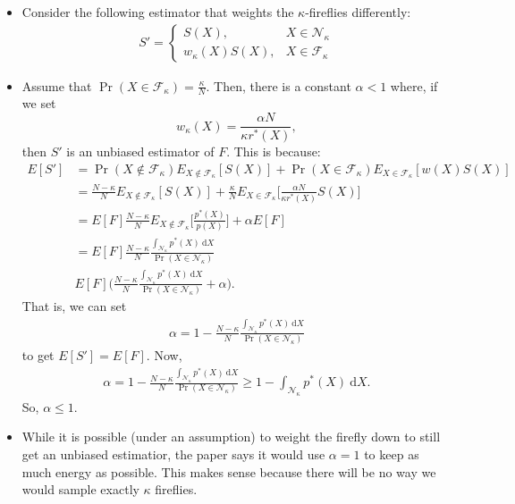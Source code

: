\documentclass[10pt]{article}
\newcommand{\dee}{\mathrm{d}}
\begin{document}
  \begin{itemize}
  	\item Consider the following estimator that weights the $\kappa$-fireflies differently:
  	\begin{align*}
  		S' = \begin{cases}
  			S(X), & X \in \mathcal{N}_\kappa \\
  			w_\kappa(X) S(X), & X \in \mathcal{F}_\kappa 
  		\end{cases}
  	\end{align*}

  	\item Assume that $\Pr(X \in \mathcal{F}_\kappa) = \frac{\kappa}{N}$. Then, there is a constant $\alpha < 1$ where, if we set $$w_\kappa(X) = \frac{\alpha N}{\kappa r^*(X)},$$ then $S'$ is an unbiased estimator of $F$. This is because:
  	\begin{align*}
  		E[S'] 
  		&= \Pr(X \not\in \mathcal{F}_\kappa) E_{X \not\in \mathcal{F}_\kappa} [S(X)] 
  		+ \Pr(X \in \mathcal{F}_\kappa) E_{X \in \mathcal{F}_\kappa}[w(X)S(X)] \\
  		&= \frac{N-\kappa}{N} E_{X \not\in \mathcal{F}_\kappa} [S(X)] 
  		+ \frac{\kappa}{N} E_{X \in \mathcal{F}_\kappa}\bigg[ \frac{\alpha N}{\kappa r^*(X)} S(X)\bigg] \\
  		&= E[F] \frac{N-\kappa}{N} E_{X \not\in \mathcal{F}_\kappa} \bigg[ \frac{p^*(X)}{p(X)} \bigg]
  		+ \alpha E[F] \\ 
  		&= E[F] \frac{N-\kappa}{N} \frac{\int_{\mathcal{N}_\kappa} p^*(X)\ \dee X }{\Pr(X \in \mathcal{N}_\kappa)} \\
  		& E[F] \bigg( \frac{N-\kappa}{N} \frac{\int_{\mathcal{N}_\kappa} p^*(X)\ \dee X }{\Pr(X \in \mathcal{N}_\kappa)}
  		+ \alpha \bigg).
  	\end{align*}
  	That is, we can set 
  	\begin{align*}
  		\alpha = 1 - \frac{N-\kappa}{N} \frac{\int_{\mathcal{N}_\kappa} p^*(X)\ \dee X }{\Pr(X \in \mathcal{N}_\kappa)}
  	\end{align*}
  	to get $E[S'] = E[F]$.
  	Now,
  	\begin{align*}
  		\alpha = 1 - \frac{N-\kappa}{N} \frac{\int_{\mathcal{N}_\kappa} p^*(X)\ \dee X }{\Pr(X \in \mathcal{N}_\kappa)}
  		\geq 1 - \int_{\mathcal{N}_\kappa} p^*(X)\ \dee X.
  	\end{align*}
  	So, $\alpha \leq 1$.

  	\item While it is possible (under an assumption) to weight the firefly down to still get an unbiased estimatior, the paper says it would use $\alpha = 1$ to keep as much energy as possible. This makes sense because there will be no way we would sample exactly $\kappa$ fireflies.


\end{itemize}
\end{document}
